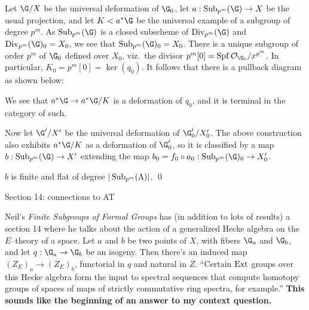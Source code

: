 Let $\G/X$ be the universal deformation of $\G_0$, let $a: \Sub_{p^m}(\G) \to X$ be the usual projection, and let $K < a^* \G$ be the universal example of a subgroup of degree $p^m$.  As $\Sub_{p^m}(\G)$ is a closed subscheme of $\Div_{p^m}(\G)$ and $\Div_{p^m}(\G)_0 = X_0$, we see that $\Sub_{p^m}(\G)_0 = X_0$.  There is a unique subgroup of order $p^m$ of $\G_0$ defined over $X_0$, viz.\ the divisor $p^m[0] = \Spf \sheaf O_{\G_0} / x^{p^m}$.  In particular, $K_0 = p^m[0] = \ker(q_0)$.  It follows that there is a pullback diagram as shown below:
\begin{center}
\end{center}
We see that $a^* \G \to a^* \G/K$ is a deformation of $q_0$, and it is terminal in the category of such.

Now let $\G' / X'$ be the universal deformation of $\G'_0 / X'_0$.  The above construction also exhibits $a^* \G/K$ as a deformation of $\G'_0$, so it is classified by a map $b: \Sub_{p^m}(\G) \to X'$ extending the map $b_0 = f_0 \circ a_0: \Sub_{p^m}(\G)_0 \to X'_0$.

\begin{theorem}
$b$ is finite and flat of degree $|\operatorname{Sub}_{p^m}(\Lambda)|$. \qed
\end{theorem}


Section 14: connections to AT

Neil's \textit{Finite Subgroups of Formal Groups} has (in addition to lots of results) a section 14 where he talks about the action of a generalized Hecke algebra on the $E$--theory of a space.  Let $a$ and $b$ be two points of $X$, with fibers $\G_a$ and $\G_b$, and let $q: \G_a \to \G_b$ be an isogeny.  Then there's an induced map $(Z_E)_a \to (Z_E)_b$, functorial in $q$ and natural in $Z$.  ``Certain $\operatorname{Ext}$ groups over this Hecke algebra form the input to spectral sequences that compute homotopy groups of spaces of maps of strictly commutative ring spectra, for example.''  \textbf{This sounds like the beginning of an answer to my context question.}

